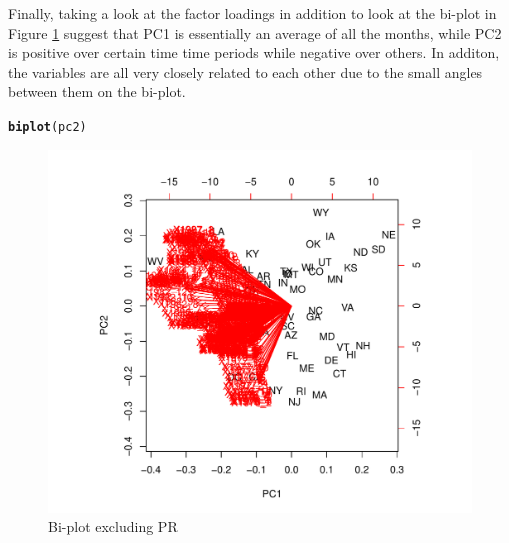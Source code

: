 \documentclass[12pt, leqno]{article}\usepackage[]{graphicx}\usepackage[]{color}
\makeatletter
\def\maxwidth{ %
  \ifdim\Gin@nat@width>\linewidth
    \linewidth
  \else
    \Gin@nat@width
  \fi
}
\newcommand{\hlstd}[1]{\textcolor[rgb]{0.345,0.345,0.345}{#1}}%
\newcommand{\hlkwd}[1]{\textcolor[rgb]{0.737,0.353,0.396}{\textbf{#1}}}%
\newenvironment{kframe}{%
 \def\at@end@of@kframe{}%
 \ifinner\ifhmode%
  \def\at@end@of@kframe{\end{minipage}}%
  \begin{minipage}{\columnwidth}%
 \fi\fi%
 \def\FrameCommand##1{\hskip\@totalleftmargin \hskip-\fboxsep
 \colorbox{shadecolor}{##1}\hskip-\fboxsep
     \hskip-\linewidth \hskip-\@totalleftmargin \hskip\columnwidth}%
 \MakeFramed {\advance\hsize-\width
   \@totalleftmargin\z@ \linewidth\hsize
   \@setminipage}}%
 {\par\unskip\endMakeFramed%
 \at@end@of@kframe}
\newenvironment{knitrout}{}{} %
\makeatother
\begin{document}
Finally, taking a look at the factor loadings in addition to look at
the bi-plot in Figure \ref{fig:p1e} suggest that PC1 is essentially an
average of all the months, while PC2 is positive over certain time
time periods while negative over others. In additon, the variables are
all very closely related to each other due to the small angles between
them on the bi-plot.
\begin{knitrout}
\color{fgcolor}\begin{kframe}
\begin{alltt}
\hlkwd{biplot}\hlstd{(pc2)}
\end{alltt}
\end{kframe}\begin{figure}[H]
\includegraphics[width=\maxwidth]{figure/p1e-1} \caption[Bi-plot excluding PR]{Bi-plot excluding PR}\label{fig:p1e}
\end{figure}


\end{knitrout}
\end{document}
